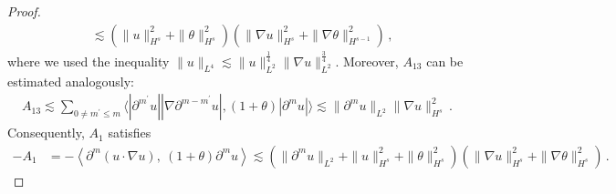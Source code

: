 \documentclass[reqno,11pt]{amsart}
\numberwithin{equation}{section}
\def\p{\partial}
\begin{document}
\begin{proof}
\begin{equation*}
\begin{aligned}
&\lesssim(\|u\|_{H^s}^2+\|\theta\|_{H^s}^2)(\|\nabla u\|_{H^s}^2+\|\nabla \theta\|_{H^{s-1}}^2) \,,
\end{aligned}
\end{equation*}
where we used the inequality $\|u\|_{L^4}\lesssim\|u\|^{\frac{1}{4}}_{L^2}\|\nabla u\|^{\frac{3}{4}}_{L^2}$. Moreover, $A_{13}$ can be estimated analogously:
\begin{equation*}
\begin{aligned}
{A_{13}} \lesssim\sum_{0\neq m^\prime \leq m } \langle | \p^{m^\prime}u||\nabla\p^{m-m^\prime}u|,(1+\theta)|\p^m u|    \rangle \lesssim\|\p^m u\|_{L^2}\|\nabla u\|^2_{H^s} \,.
\end{aligned}
\end{equation*}
Consequently, $A_1$ satisfies
\begin{equation}\label{u-eq2}
\begin{aligned}
-A_1&=-\left\langle \partial^m(u\cdot\nabla u),\ (1+\theta)\partial^m u\right\rangle \lesssim(\|\p^m u\|_{L^2}+\| u\|^2_{H^s}+\| \theta\|^2_{H^s})(\|\nabla u\|^2_{H^s}+\| \nabla \theta\|^2_{H^s})
 \,.
\end{aligned}
\end{equation}


\end{proof}
\end{document}
